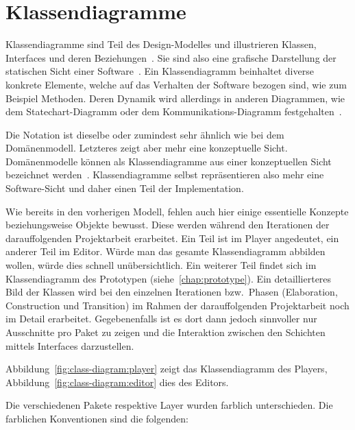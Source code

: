 
\section{Klassendiagramme}
\label{sec:class-diagrams}

Klassendiagramme sind Teil des Design-Modelles und illustrieren Klassen,
Interfaces und deren Beziehungen~\cite[S. 249 bis 251]{larman_applying_2004}.
Sie sind also eine grafische Darstellung der statischen Sicht einer
Software~\cite[S. 217]{rumbaugh_unified_2004}. Ein Klassendiagramm beinhaltet
diverse konkrete Elemente, welche auf das Verhalten der Software bezogen sind,
wie zum Beispiel Methoden. Deren Dynamik wird allerdings in anderen Diagrammen,
wie dem Statechart-Diagramm oder dem Kommunikations-Diagramm
festgehalten~\cite[S. 217]{rumbaugh_unified_2004}.

Die Notation ist dieselbe oder zumindest sehr ähnlich wie bei dem
Domänenmodell. Letzteres zeigt aber mehr eine konzeptuelle Sicht.
Domänenmodelle können als Klassendiagramme aus einer konzeptuellen Sicht
bezeichnet werden~\cite[S. 249]{larman_applying_2004}. Klassendiagramme selbst
repräsentieren also mehr eine Software-Sicht und daher einen Teil der
Implementation.

Wie bereits in den vorherigen Modell, fehlen auch hier einige essentielle
Konzepte beziehungsweise Objekte bewusst.  Diese werden während den Iterationen
der darauffolgenden Projektarbeit erarbeitet. Ein Teil ist im Player
angedeutet, ein anderer Teil im Editor. Würde man das gesamte Klassendiagramm
abbilden wollen, würde dies schnell unübersichtlich. Ein weiterer Teil findet
sich im Klassendiagramm des Prototypen (siehe~\autoref{chap:prototype}). Ein
detaillierteres Bild der Klassen wird bei den einzelnen Iterationen bzw.\
Phasen (Elaboration, Construction und Transition) im Rahmen der darauffolgenden
Projektarbeit noch im Detail erarbeitet. Gegebenenfalls ist es dort dann jedoch
sinnvoller nur Ausschnitte pro Paket zu zeigen und die Interaktion zwischen den
Schichten mittels Interfaces darzustellen.

Abbildung~\ref{fig:class-diagram:player} zeigt das Klassendiagramm des
Players, Abbildung~\ref{fig:class-diagram:editor} dies des Editors.

Die verschiedenen Pakete respektive Layer wurden farblich unterschieden. Die
farblichen Konventionen sind die folgenden:

